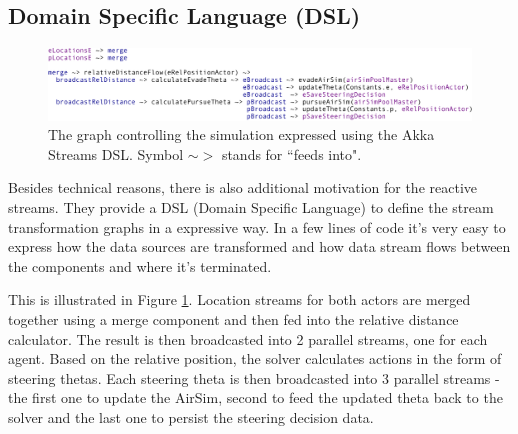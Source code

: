 \documentclass{article}
\let\cite\citep
\begin{document}
\subsection{Domain Specific Language (DSL)}
\begin{figure}
	\centering
	\includegraphics[width=17.0cm]{streams-SDL}
	\caption{The graph controlling the simulation expressed using the Akka Streams DSL. Symbol $\sim$$>$ stands for ``feeds into".}\label{fig:streas-SDL}
\end{figure}

Besides technical reasons, there is also additional motivation for the reactive streams. They provide a DSL (Domain Specific Language) \cite{dsl-book} to define the stream transformation graphs in a expressive way. In a few lines of code it's very easy to express how the data sources are transformed and how data stream flows between the components and where it's terminated.

This is illustrated in Figure \ref{fig:streas-SDL}. Location streams for both actors are merged together using a merge component and then fed into the relative distance calculator. The result is then broadcasted into 2 parallel streams, one for each agent. Based on the relative position, the solver calculates actions in the form of steering thetas. Each steering theta is then broadcasted into 3 parallel streams - the first one to update the AirSim, second to feed the updated theta back to the solver and the last one to persist the steering decision data.









 
\end{document}
